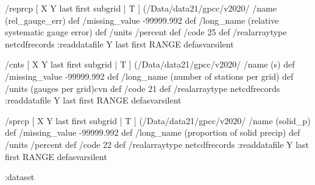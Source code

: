 \begin{ingrid}
   /reprcp{
      [ X Y last first subgrid | T ] (/Data/data21/gpcc/v2020/%
      /name (rel_gauge_err) def
       /missing_value -99999.992 def
       /long_name (relative systematic gauge error) def
       /units /percent def
       /code 25 def
       /realarraytype netcdfrecords :readdatafile
       Y last first RANGE
   }defasvarsilent

   /cnts{
      [ X Y last first subgrid | T ] (/Data/data21/gpcc/v2020/%
      /name (s) def
       /missing_value -99999.992 def
       /long_name (number of stations per grid) def
       /units (gauges per grid)cvn def
       /code 21 def
       /realarraytype netcdfrecords :readdatafile
       Y last first RANGE
   }defasvarsilent

   /sprcp{
      [ X Y last first subgrid | T ] (/Data/data21/gpcc/v2020/%
      /name (solid_p) def
       /missing_value -99999.992 def
       /long_name (proportion of solid precip) def
       /units /percent def
       /code 22 def
       /realarraytype netcdfrecords :readdatafile
       Y last first RANGE
   }defasvarsilent


:dataset
\end{ingrid}


